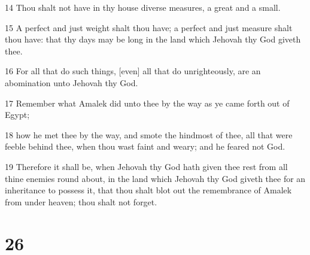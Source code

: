 \par 14 Thou shalt not have in thy house diverse measures, a great and a small.
\par 15 A perfect and just weight shalt thou have; a perfect and just measure shalt thou have: that thy days may be long in the land which Jehovah thy God giveth thee.
\par 16 For all that do such things, [even] all that do unrighteously, are an abomination unto Jehovah thy God.
\par 17 Remember what Amalek did unto thee by the way as ye came forth out of Egypt;
\par 18 how he met thee by the way, and smote the hindmost of thee, all that were feeble behind thee, when thou wast faint and weary; and he feared not God.
\par 19 Therefore it shall be, when Jehovah thy God hath given thee rest from all thine enemies round about, in the land which Jehovah thy God giveth thee for an inheritance to possess it, that thou shalt blot out the remembrance of Amalek from under heaven; thou shalt not forget.

\chapter{26}

